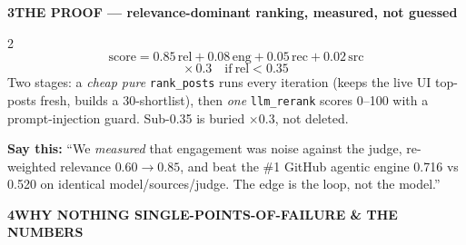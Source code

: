 \documentclass[10pt,a4paper]{article}
\newcommand{\code}[1]{\texttt{\small #1}}
\newcommand{\band}[2]{%
  \vspace{1pt}\noindent\colorbox{#1}{\begin{minipage}{\dimexpr\linewidth-2\fboxsep}%
  \color{white}\bfseries\small #2\end{minipage}}\par\vspace{0pt}}
\begin{document}
\band{ok}{3\quad THE PROOF — relevance-dominant ranking, measured, not guessed}

\begin{multicols}{2}
\[
\text{score}=0.85\,\text{rel}+0.08\,\text{eng}+0.05\,\text{rec}+0.02\,\text{src}
\]
\vspace{-6pt}
\[
\times\,0.3\quad\text{if}\ \text{rel}<0.35
\]
{\footnotesize Two stages: a \emph{cheap pure} \code{rank\_posts} runs every iteration (keeps the live UI top-posts fresh, builds a 30-shortlist), then \emph{one} \code{llm\_rerank} scores 0--100 with a prompt-injection guard. Sub-0.35 is buried $\times0.3$, not deleted.}

\columnbreak

\begin{center}
\end{center}
\end{multicols}
\vspace{-4pt}
{\footnotesize\textbf{Say this:} ``We \emph{measured} that engagement was noise against the judge, re-weighted relevance $0.60\rightarrow0.85$, and beat the \#1 GitHub agentic engine 0.716 vs 0.520 on identical model/sources/judge. The edge is the loop, not the model.''}

\band{warn}{4\quad WHY NOTHING SINGLE-POINTS-OF-FAILURE \& THE NUMBERS}
\end{document}
